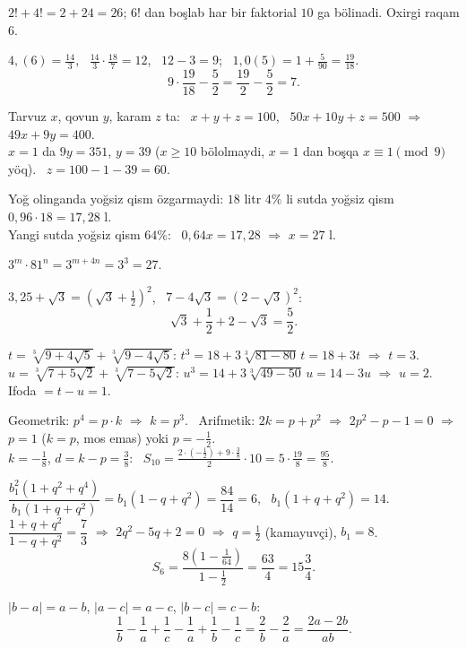 




$2!+4!=2+24=26$; $6!$ dan boşlab har bir faktorial $10$ ga bölinadi. Oxirgi raqam $6$.

$4{,}(6)=\frac{14}3$, \ $\frac{14}3\cdot\frac{18}7=12$, \ $12-3=9$; \ $1{,}0(5)=1+\frac5{90}=\frac{19}{18}$.
\[9\cdot\frac{19}{18}-\frac52=\frac{19}2-\frac52=7.\]

Tarvuz $x$, qovun $y$, karam $z$ ta: \ $x+y+z=100$, \ $50x+10y+z=500$ $\Rightarrow$ $49x+9y=400$.\\
$x=1$ da $9y=351$, $y=39$ ($x\ge10$ bölolmaydi, $x=1$ dan boşqa $x\equiv1\pmod 9$ yöq). \ $z=100-1-39=60$.

Yoğ olinganda yoğsiz qism özgarmaydi: $18$ litr $4\%$ li sutda yoğsiz qism $0{,}96\cdot18=17{,}28$ l.\\
Yangi sutda yoğsiz qism $64\%$: \ $0{,}64x=17{,}28$ $\Rightarrow$ $x=27$ l.

$3^m\cdot81^n=3^{m+4n}=3^3=27$.

$3{,}25+\sqrt3=\left(\sqrt3+\frac12\right)^2$, \ $7-4\sqrt3=\left(2-\sqrt3\right)^2$:
\[\sqrt3+\frac12+2-\sqrt3=\frac52.\]

$t=\sqrt[3]{9+4\sqrt5}+\sqrt[3]{9-4\sqrt5}$: $t^3=18+3\sqrt[3]{81-80}\,t=18+3t$ $\Rightarrow$ $t=3$.\\
$u=\sqrt[3]{7+5\sqrt2}+\sqrt[3]{7-5\sqrt2}$: $u^3=14+3\sqrt[3]{49-50}\,u=14-3u$ $\Rightarrow$ $u=2$.\\
Ifoda $=t-u=1$.

Geometrik: $p^4=p\cdot k$ $\Rightarrow$ $k=p^3$. \ Arifmetik: $2k=p+p^2$ $\Rightarrow$ $2p^2-p-1=0$ $\Rightarrow$ $p=1$ ($k=p$, mos emas) yoki $p=-\frac12$.\\
$k=-\frac18$, $d=k-p=\frac38$: \ $S_{10}=\frac{2\cdot\left(-\frac12\right)+9\cdot\frac38}2\cdot10=5\cdot\frac{19}8=\frac{95}8$.

$\dfrac{b_1^2(1+q^2+q^4)}{b_1(1+q+q^2)}=b_1(1-q+q^2)=\dfrac{84}{14}=6$, \ $b_1(1+q+q^2)=14$.\\
$\dfrac{1+q+q^2}{1-q+q^2}=\dfrac73$ $\Rightarrow$ $2q^2-5q+2=0$ $\Rightarrow$ $q=\frac12$ (kamayuvçi), $b_1=8$.
\[S_6=\frac{8\left(1-\frac1{64}\right)}{1-\frac12}=\frac{63}4=15\frac34.\]

$|b-a|=a-b$, $|a-c|=a-c$, $|b-c|=c-b$:
\[\frac1b-\frac1a+\frac1c-\frac1a+\frac1b-\frac1c=\frac2b-\frac2a=\frac{2a-2b}{ab}.\]

